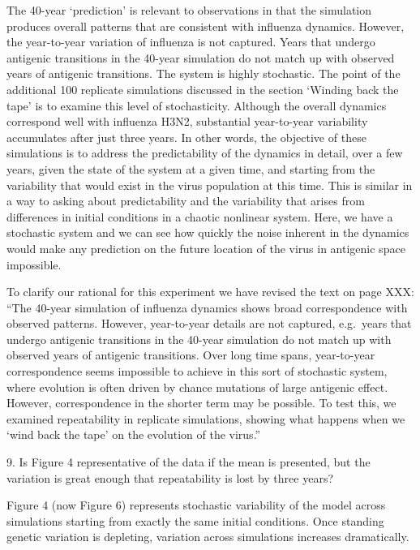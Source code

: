 \documentclass[11pt,oneside,letterpaper]{article}
\def\comment#1{
#1
}
\def\response#1{
\begin{bf}
#1
\end{bf}
}
\def\break{\vspace{0.2cm}}
\begin{document}
\response{The 40-year `prediction' is relevant to observations in that the simulation produces overall patterns that are consistent with influenza dynamics.  However, the year-to-year variation of influenza is not captured.  Years that undergo antigenic transitions in the 40-year simulation do not match up with observed years of antigenic transitions.  The system is highly stochastic.  The point of the additional 100 replicate simulations discussed in the section `Winding back the tape' is to examine this level of stochasticity.  Although the overall dynamics correspond well with influenza H3N2, substantial year-to-year variability accumulates after just three years.  In other words, the objective of these simulations is to address the predictability of the dynamics in detail, over a few years, given the state of the system at a given time, and starting from the variability that would exist in the virus population at this time.  This is similar in a way to asking about predictability and the variability that arises from differences in initial conditions in a chaotic nonlinear system.  Here, we have a stochastic system and we can see how quickly the noise inherent in the dynamics would make any prediction on the future location of the virus in antigenic space impossible.}

\response{To clarify our rational for this experiment we have revised the text on page XXX: ``The 40-year simulation of influenza dynamics shows broad correspondence with observed patterns. However, year-to-year details are not captured, e.g.\ years that undergo antigenic transitions in the 40-year simulation do not match up with observed years of antigenic transitions.  Over long time spans, year-to-year correspondence seems impossible to achieve in this sort of stochastic system, where evolution is often driven by chance mutations of large antigenic effect.  However, correspondence in the shorter term may be possible.  To test this, we examined repeatability in replicate simulations, showing what happens when we `wind back the tape' on the evolution of the virus.''}

\break

\comment{9. Is Figure 4 representative of the data if the mean is presented, but the variation is great enough that repeatability is lost by three years?}

\response{Figure 4 (now Figure 6) represents stochastic variability of the model across simulations starting from exactly the same initial conditions.  Once standing genetic variation is depleting, variation across simulations increases dramatically.}
\end{document}
